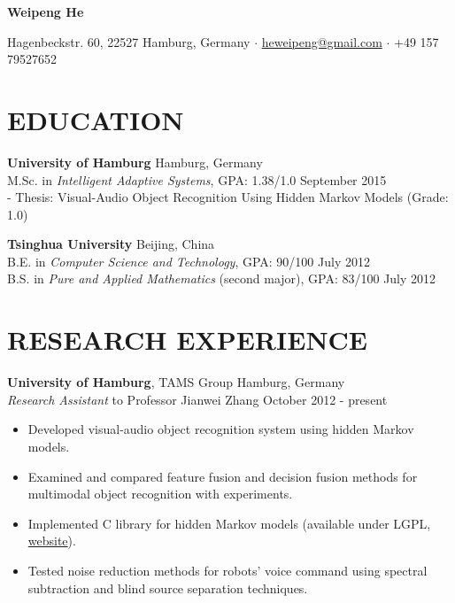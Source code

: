\documentclass[a4paper,11pt]{article} %
\newcommand{\ind}{\hspace*{1em}}
\begin{document}
\thispagestyle{empty}


\begin{center}
  {\Huge\bfseries Weipeng He}

  Hagenbeckstr. 60, 22527 Hamburg, Germany $\cdotp$
  \href{mailto:heweipeng@gmail.com}{heweipeng@gmail.com} $\cdotp$
  +49 157 79527652
\end{center}


\section{EDUCATION}
\textbf{University of Hamburg} \hfill Hamburg, Germany \\
\ind M.Sc. in \textit{Intelligent Adaptive Systems}, GPA: 1.38/1.0  \hfill September 2015 \\
\ind - Thesis: Visual-Audio Object Recognition Using Hidden Markov Models (Grade: 1.0)

\textbf{Tsinghua University} \hfill Beijing, China \\
\ind B.E. in \textit{Computer Science and Technology}, GPA: 90/100 \hfill July 2012 \\
\ind B.S. in \textit{Pure and Applied Mathematics} (second major), GPA: 83/100 \hfill July 2012


\section{RESEARCH EXPERIENCE}

\textbf{University of Hamburg}, TAMS Group \hfill Hamburg, Germany \\
\textit{Research Assistant} to Professor Jianwei Zhang \hfill October 2012 - present
\vspace{-\parskip}
\begin{itemize}
  \item Developed visual-audio object recognition system using hidden Markov models.
  \item Examined and compared feature fusion and decision fusion methods for multimodal object recognition with experiments.
  \item Implemented C library for hidden Markov models (available under LGPL, \href{https://github.com/hwp/notGHMM}{website}).
  \item Tested noise reduction methods for robots' voice command using spectral subtraction and blind source separation techniques.
\end{itemize}
\end{document}
